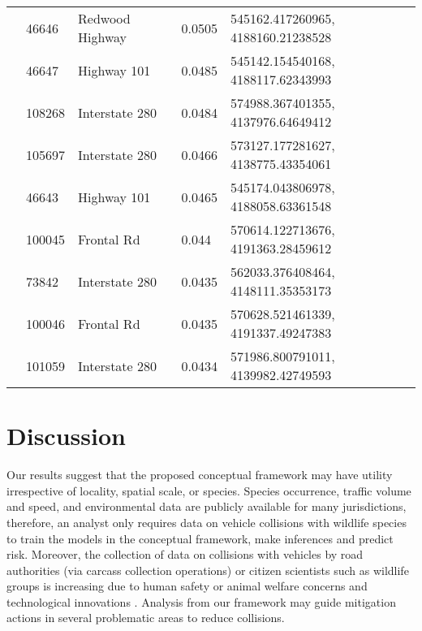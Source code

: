 \begin{table}[!h]
\begin{tabularx}{0.9\textwidth}{@{}llllX@{}}
           & 46646  & Redwood Highway & 0.0505         & 545162.417260965, 4188160.21238528 \\
           & 46647  & Highway 101     & 0.0485         & 545142.154540168, 4188117.62343993 \\
           & 108268 & Interstate 280  & 0.0484         & 574988.367401355, 4137976.64649412 \\
           & 105697 & Interstate 280  & 0.0466         & 573127.177281627, 4138775.43354061 \\
           & 46643  & Highway 101     & 0.0465         & 545174.043806978, 4188058.63361548 \\
           & 100045 & Frontal Rd      & 0.044          & 570614.122713676, 4191363.28459612 \\
           & 73842  & Interstate 280  & 0.0435         & 562033.376408464, 4148111.35353173 \\
           & 100046 & Frontal Rd      & 0.0435         & 570628.521461339, 4191337.49247383 \\
           & 101059 & Interstate 280  & 0.0434         & 571986.800791011, 4139982.42749593 \\
\bottomrule
\end{tabularx}
\label{rd_seg_risk}
\end{table}

\section{Discussion}

Our results suggest that the proposed conceptual framework may have utility irrespective of locality, spatial scale, or species.  Species occurrence, traffic volume and speed, and environmental data are publicly available for many jurisdictions, therefore, an analyst only requires data on vehicle collisions with wildlife species to train the models in the conceptual framework, make inferences and predict risk.  Moreover, the collection of data on collisions with vehicles by road authorities (via carcass collection operations) or citizen scientists such as wildlife groups is increasing due to human safety or animal welfare concerns and technological innovations \citep[see][]{olso14,shil15b}.  Analysis from our framework may guide mitigation actions in several problematic areas to reduce collisions.

